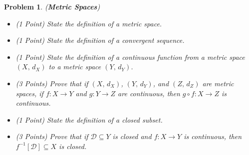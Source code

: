 \documentclass{article}
\theoremstyle{normal}
\newtheorem{problem}{Problem}
\begin{document}
    \clearpage
    \begin{problem}
        (\textbf{Metric Spaces})
        \par\hfill\par
        \begin{itemize}
            \item (1 Point) State the definition of a metric space.
            \item (1 Point) State the definition of a convergent sequence.
            \item (1 Point) State the definition of a continuous function
                from a metric space $(X,\,d_{X})$ to a
                metric space $(Y,\,d_{Y})$.
            \item (3 Points) Prove that if $(X,\,d_{X})$, $(Y,\,d_{Y})$, and
                $(Z,\,d_{Z})$ are metric spaces, if $f:X\rightarrow{Y}$ and
                $g:Y\rightarrow{Z}$ are continuous, then
                $g\circ{f}:X\rightarrow{Z}$ is continuous.
            \item (1 Point) State the definition of a closed subset.
            \item (3 Points) Prove that if $\mathcal{D}\subseteq{Y}$ is closed
                and $f:X\rightarrow{Y}$ is continuous, then
                $f^{-1}[\mathcal{D}]\subseteq{X}$ is closed.
        \end{itemize}
    \end{problem}
    \clearpage
\end{document}

